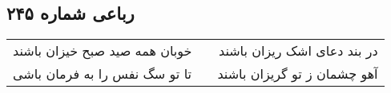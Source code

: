 \begin{center}
\section*{رباعی شماره ۲۴۵}
\label{sec:sh245}
\begin{longtable}{l p{0.5cm} r}
خوبان همه صید صبح خیزان باشند
&&
در بند دعای اشک ریزان باشند
\\
تا تو سگ نفس را به فرمان باشی
&&
آهو چشمان ز تو گریزان باشند
\\
\end{longtable}
\end{center}
